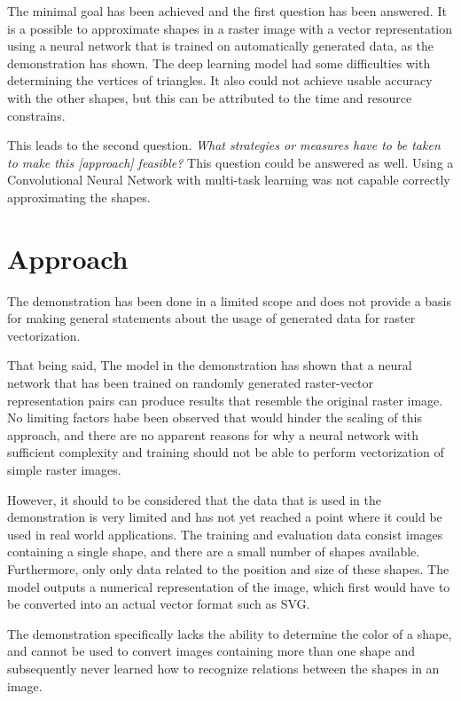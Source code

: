 \documentclass[12pt, a4paper, titlepage]{report}
\begin{document}
The minimal goal has been achieved and the first question has been answered. It is a possible to approximate shapes in a raster image with a vector representation using a neural network that is trained on automatically generated data, as the demonstration has shown. The deep learning model had some difficulties with determining the vertices of triangles. It also could not achieve usable accuracy with the other shapes, but this can be attributed to the time and resource constrains.

This leads to the second question. \emph{What strategies or measures have to be taken to make this [approach] feasible?}
This question could be answered as well. Using a Convolutional Neural Network with multi-task learning was not capable correctly approximating the shapes.

\section{Approach}

The demonstration has been done in a limited scope and does not provide a basis for making general statements about the usage of generated data for raster vectorization.

That being said, The model in the demonstration has shown that a neural network that has been trained on randomly generated raster-vector representation pairs can produce results that resemble the original raster image.
No limiting factors habe been observed that would hinder the scaling of this approach, and there are no apparent reasons for why a neural network with sufficient complexity and training should not be able to perform vectorization of simple raster images.


However, it should to be considered that the data that is used in the demonstration is very limited and has not yet reached a point where it could be used in real world applications. The training and evaluation data consist images containing a single shape, and there are a small number of shapes available. Furthermore, only only data related to the position and size of these shapes. The model outputs a numerical representation of the image, which first would have to be converted into an actual vector format such as SVG.

The demonstration specifically lacks the ability to determine the color of a shape, and cannot be used to convert images containing more than one shape and subsequently never learned how to recognize relations between the shapes in an image.
\end{document}
